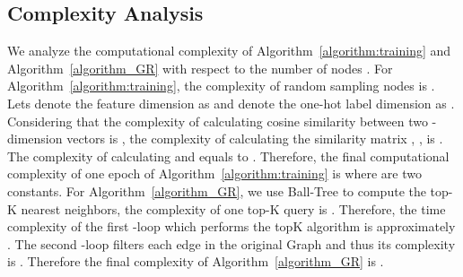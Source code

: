 \documentclass[sigconf]{acmart}
\begin{document}
	\subsection{Complexity Analysis}
	We analyze the computational complexity of Algorithm~\ref{algorithm:training} and Algorithm~\ref{algorithm_GR}  with respect to the number of nodes . For Algorithm~\ref{algorithm:training}, the complexity of random sampling  nodes is . Lets denote the feature dimension as   and denote the one-hot label dimension as . Considering that the complexity of calculating cosine similarity between two -dimension vectors is , the complexity of calculating the similarity matrix , ,   is . 
	The complexity of calculating  and  equals to .  Therefore, the final computational complexity of one epoch of Algorithm~\ref{algorithm:training} is  where  are two constants.
	For Algorithm~\ref{algorithm_GR}, we use Ball-Tree to compute the top-K nearest neighbors, the complexity of one top-K query is  . Therefore, the time complexity of the first -loop which performs the topK algorithm is approximately . The second -loop filters each edge in the original Graph and thus its complexity is . Therefore the final complexity of Algorithm~\ref{algorithm_GR} is .
	 	
\end{document}
